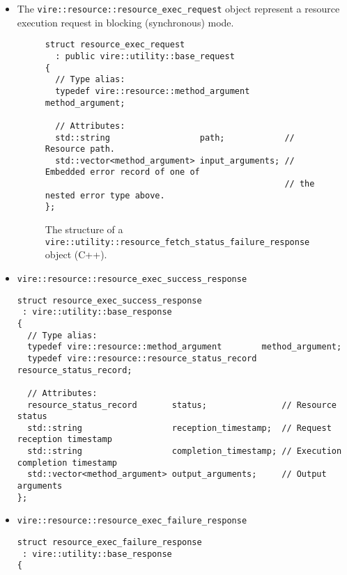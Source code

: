 \begin{itemize}

\item The \texttt{vire::resource::resource\_exec\_request} object represent a resource execution request
in blocking (synchronous) mode.


\begin{figure}[h]
\vskip 10pt
\small
\begin{Verbatim}[frame=single,xleftmargin=0.cm,label=\fbox{C++}]
struct resource_exec_request
  : public vire::utility::base_request
{
  // Type alias:
  typedef vire::resource::method_argument method_argument;

  // Attributes:
  std::string                  path;            // Resource path.
  std::vector<method_argument> input_arguments; // Embedded error record of one of
                                                // the nested error type above.
};
\end{Verbatim}
\normalsize
\caption{The structure of a \texttt{vire::utility::resource\_fetch\_status\_failure\_response} object
  (C++).}
\label{fig-app-payload-resource_fetch_status_failure_response}
\end{figure}

\item \texttt{vire::resource::resource\_exec\_success\_response}

\small
\begin{Verbatim}[frame=single,xleftmargin=0.cm,label=\fbox{C++}]
struct resource_exec_success_response
 : vire::utility::base_response
{
  // Type alias:
  typedef vire::resource::method_argument        method_argument;
  typedef vire::resource::resource_status_record resource_status_record;

  // Attributes:
  resource_status_record       status;               // Resource status
  std::string                  reception_timestamp;  // Request reception timestamp
  std::string                  completion_timestamp; // Execution completion timestamp
  std::vector<method_argument> output_arguments;     // Output arguments
};
\end{Verbatim}



\item \texttt{vire::resource::resource\_exec\_failure\_response}


\small
\begin{Verbatim}[frame=single,xleftmargin=0.cm,label=\fbox{C++}]
struct resource_exec_failure_response
 : vire::utility::base_response
{


\end{Verbatim}
\end{itemize}
